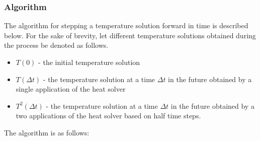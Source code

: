 \documentclass[letterpaper]{report}
\begin{document}
\subsubsection{Algorithm}
The algorithm for stepping a temperature solution forward in time is described below. For the sake of brevity, let different temperature solutions
obtained during the process be denoted as follows.
\begin{itemize}
    \item $T(0)$ - the initial temperature solution
    \item $T(\Delta t)$ - the temperature solution at a time $\Delta t$ in the future obtained by a single application of the heat solver
    \item $T^2(\Delta t)$ - the temperature solution at a time $\Delta t$ in the future obtained by a two applications of the heat solver based on
      half time steps.
\end{itemize}
The algorithm is as follows:
\end{document}
